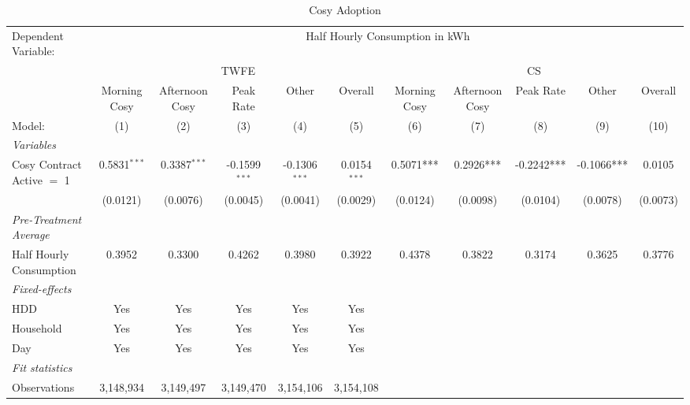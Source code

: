 
\begin{table}[htbp]
   \caption{\label{tab:did-main} Cosy Adoption}
   \centering
   \begin{tabular}{@{}l@{}c@{}c@{}c@{}c@{}c@{}c@{}c@{}c@{}c@{}c@{}}
      \tabularnewline \midrule \midrule
      Dependent Variable: & \multicolumn{10}{c}{Half Hourly Consumption in kWh}\\
       & \multicolumn{5}{c}{TWFE} & \multicolumn{5}{c}{CS} \\ 
                                     & Morning Cosy   & Afternoon Cosy & Peak Rate       & Other           & Overall        & Morning Cosy   & Afternoon Cosy & Peak Rate       & Other           & Overall \\   
      Model:                         & (1)            & (2)            & (3)             & (4)             & (5)            & (6)            & (7)            & (8)             & (9)             & (10)\\  
      \midrule
      \emph{Variables}\\
      Cosy Contract Active $=$ 1      &  0.5831$^{***}$  &  0.3387$^{***}$  &  -0.1599$^{***}$  &  -0.1306$^{***}$  &  0.0154$^{***}$  & 0.5071*** & 0.2926*** & -0.2242*** & -0.1066*** & 0.0105 \\
                                      &  (0.0121)        &  (0.0076)        &  (0.0045)         &  (0.0041)         &  (0.0029)        & (0.0124) & (0.0098) & (0.0104) & (0.0078) & (0.0073) \\
\midrule
\emph{Pre-Treatment Average}\\
      Half Hourly Consumption         &  0.3952          &  0.3300          &  0.4262           &  0.3980           &  0.3922          & 0.4378 & 0.3822 & 0.3174 & 0.3625 & 0.3776 \\
      \midrule
      \emph{Fixed-effects}\\
      HDD                             &  Yes             &  Yes             &  Yes              &  Yes              &  Yes             &  &  &  &  &  \\
      Household                       &  Yes             &  Yes             &  Yes              &  Yes              &  Yes             &  &  &  &  &  \\
      Day                             &  Yes             &  Yes             &  Yes              &  Yes              &  Yes             &  &  &  &  &  \\
      \midrule
      \emph{Fit statistics}\\
      Observations                    &  3,148,934       &  3,149,497       &  3,149,470        &  3,154,106        &  3,154,108       &  &  &  &  &  \\

\end{tabular}
\end{table}
